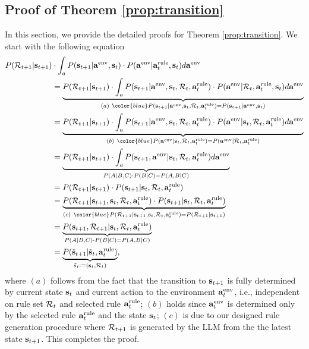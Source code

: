 \subsection{Proof of Theorem \ref{prop:transition}}
In this section, we provide the detailed proofs for Theorem \ref{prop:transition}.
We start with the following equation
\begin{align}
P( \cR_{t+1}|\bs_{t+1})&\cdot \int_a P(\bs_{t+1}|\aenv,\bs_t)
    \cdot P(\aenv|\arule_t, \bs_t)d\aenv\nonumber\allowdisplaybreaks\\
   &= \underset{(a)~ {\color{blue} P(\bs_{t+1}|\aenv,\bs_t, \cR_t, \arule_t)=P(\bs_{t+1}|\aenv,\bs_t)}}{\underbrace{P( \cR_{t+1}|\bs_{t+1})\cdot\int_a P(\bs_{t+1}|\aenv,\bs_t, \cR_t, \arule_t)\cdot P(\aenv|\cR_{t}, \arule_t, \bs_t)d\aenv}}\nonumber\allowdisplaybreaks\\
   &=\underset{(b)~{\color{blue}P(\aenv|\bs_t,\cR_{t}, \arule_t)=P(\aenv|\cR_{t}, \arule_t)}}{\underbrace{ P( \cR_{t+1}|\bs_{t+1})\cdot\int_a P(\bs_{t+1}|\aenv,\bs_t, \cR_t, \arule_t)\cdot P(\aenv|\bs_t,\cR_{t}, \arule_t)d\aenv}}\nonumber\allowdisplaybreaks\\
   &= \underset{P(A|B,C)\cdot P(B|C)=P(A, B|C)}{\underbrace{P( \cR_{t+1}|\bs_{t+1})\cdot\int_a P(\bs_{t+1},\aenv|\bs_t, \cR_t, \arule_t)d\aenv}}\nonumber\allowdisplaybreaks\\
   &=P( \cR_{t+1}|\bs_{t+1})\cdot P(\bs_{t+1}|\bs_t, \cR_t, \arule_t)\nonumber\allowdisplaybreaks\\
   &=\underset{(c)~{\color{blue}P( \cR_{t+1}|\bs_{t+1}, \bs_t, \cR_t, \arule_t)=P( \cR_{t+1}|\bs_{t+1})}}{\underbrace{P( \cR_{t+1}|\bs_{t+1}, \bs_t, \cR_t, \arule_t)\cdot P(\bs_{t+1}|\bs_t, \cR_t, \arule_t)}}\nonumber\allowdisplaybreaks\\
    &=\underset{P(A|B,C)\cdot P(B|C)=P(A, B|C)}{\underbrace{P(\bs_{t+1}, \cR_{t+1}|\bs_t, \cR_t, \arule_t)}}\nonumber\allowdisplaybreaks\\
    &=\underset{\tilde{s}_t:=(\bs_t,\cR_t)}{\underbrace{P(\tilde{\bs}_{t+1}|\tilde{\bs}_t, \arule_t)}},
\end{align}
where $(a)$ follows from the fact that the transition to ${\mathbf{s}}_{t+1}$ is fully determined by current state ${\mathbf{s}}_t$ and current action to the environment ${\mathbf{a}}^{\text{env}}_t$, i.e., independent on rule set ${\mathcal{R}}_t$ and selected rule ${\mathbf{a}}^{\text{rule}}_t$; $(b)$ holds since ${\mathbf{a}}^{\text{env}}_t$ is determined only by the selected rule ${\mathbf{a}}^{\text{rule}}_t$ and the state ${\mathbf{s}}_t$; $(c)$ is due to our designed rule generation procedure where ${\mathcal{R}}_{t+1}$ is generated by the LLM from the the latest state ${\mathbf{s}}_{t+1}$.  
This completes the proof.
 




